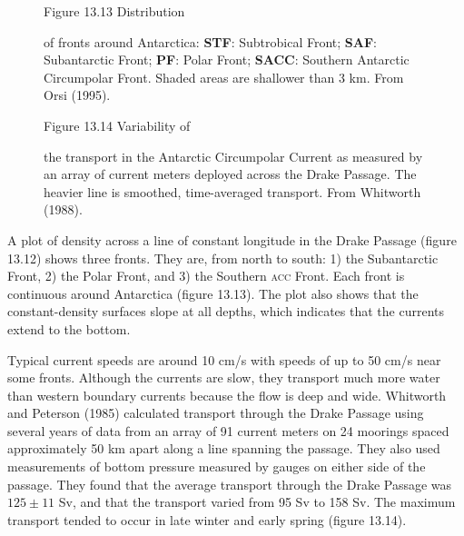 \begin{figure}[t!] %
{}
\footnotesize
Figure 13.13 Distribution \rule{0mm}{3ex}of fronts around Antarctica:
\textbf{STF}: Subtrobical Front; \textbf{SAF}: Subantarctic Front;
\textbf{PF}: Polar Front; \textbf{SACC}: Southern Antarctic
Circumpolar Front. Shaded areas are shallower than 3 km. From Orsi
(1995).

\label{fig:AACx-section}
\vspace{-3ex}
\end{figure}

\begin{figure}[b!] %
\vspace{-3ex}
\footnotesize
Figure 13.14 Variability of \rule{0mm}{5ex}the transport in the
Antarctic
Circumpolar Current as measured
by an array of current meters deployed across the Drake Passage. The
heavier line is smoothed, time-averaged transport. From Whitworth
(1988).

\label{fig:aacxport}
\end{figure}

A plot of density across a line of constant longitude in the Drake
Passage (figure 13.12) shows three fronts. They are, from north to
south: 1) the Subantarctic Front, 2) the Polar Front, and 3) the
Southern \textsc{acc} Front. Each front is continuous around
Antarctica (figure 13.13). The plot also shows that the
constant-density surfaces slope at all depths, which indicates that
the currents extend to the bottom.

Typical current speeds are around 10 cm/s with speeds of up to 50 cm/s
near some fronts. Although the currents are slow, they
transport much more water than
western boundary currents because the flow is deep and wide. Whitworth
and Peterson (1985) calculated transport through the Drake
Passage using several years of
data from an array of 91 current meters on 24 moorings spaced
approximately 50 km apart along a line spanning the passage. They also
used measurements of bottom pressure measured by gauges on either side
of the passage. They found that the average transport through the
Drake Passage was $125 \pm 11$ Sv, and that the transport varied from
95 Sv to 158 Sv. The maximum transport tended to occur in late winter
and early spring (figure 13.14).

